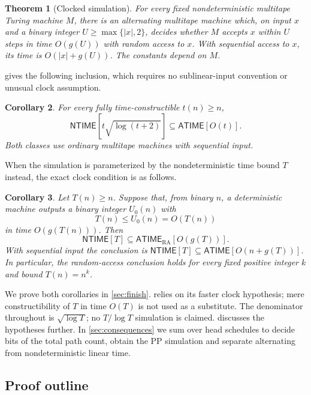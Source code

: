 \documentclass[11pt]{article}
\newtheorem{theorem}{Theorem}[section]
\newtheorem{corollary}[theorem]{Corollary}
\theoremstyle{definition}
\theoremstyle{remark}
\newcommand{\NTIME}{\mathsf{NTIME}}
\newcommand{\ATIME}{\mathsf{ATIME}}
\newcommand{\ARA}{\mathsf{ATIME}_{\mathrm{RA}}}
\begin{document}
\begin{theorem}[Clocked simulation]\label{thm:clocked}
For every fixed nondeterministic multitape Turing machine $M$, there is an alternating multitape machine which, on input $x$ and a binary integer $U\ge\max\{|x|,2\}$, decides whether $M$ accepts $x$ within $U$ steps in time $O(g(U))$ with random access to $x$. With sequential access to $x$, its time is $O(|x|+g(U))$. The constants depend on $M$.
\end{theorem}

 gives the following inclusion, which requires no sublinear-input convention or unusual clock assumption.

\begin{corollary}\label{cor:clean}
For every fully time-constructible $t(n)\ge n$,
\[
 \NTIME[t\sqrt{\log(t+2)}]\subseteq\ATIME[O(t)].
\]
Both classes use ordinary multitape machines with sequential input.
\end{corollary}

When the simulation is parameterized by the nondeterministic time bound $T$ instead, the exact clock condition is as follows.

\begin{corollary}\label{cor:original}
Let $T(n)\ge n$. Suppose that, from binary $n$, a deterministic machine outputs a binary integer $U_0(n)$ with
\[
 T(n)\le U_0(n)=O(T(n))
\]
in time $O(g(T(n)))$. Then
\[
 \NTIME[T]\subseteq\ARA[O(g(T))].
\]
With sequential input the conclusion is $\NTIME[T]\subseteq\ATIME[O(n+g(T))]$. In particular, the random-access conclusion holds for every fixed positive integer $k$ and bound $T(n)=n^k$.
\end{corollary}

We prove both corollaries in \cref{sec:finish}.  relies on its faster clock hypothesis; mere constructibility of $T$ in time $O(T)$ is not used as a substitute. The denominator throughout is $\sqrt{\log T}$; no $T/\log T$ simulation is claimed.  discusses the hypotheses further. In \cref{sec:consequences} we sum over head schedules to decide bits of the total path count, obtain the PP simulation and separate alternating from nondeterministic linear time.

\subsection{Proof outline}
\end{document}
